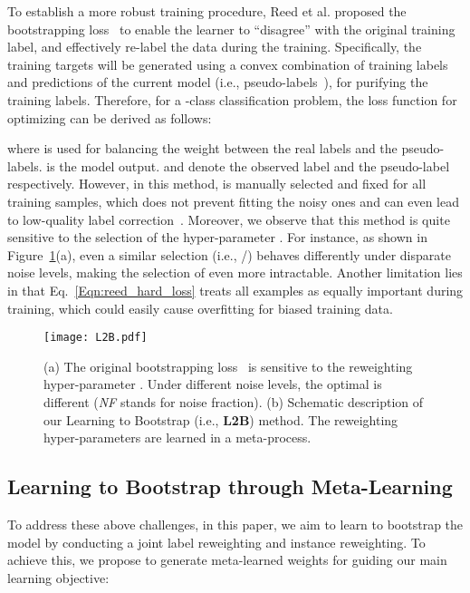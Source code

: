 \documentclass{article}
\begin{document}
To establish a more robust training procedure, Reed et al. proposed the bootstrapping loss~\cite{reed2014training} to enable the learner to ``disagree'' with the original training label, and effectively re-label the data during the training. Specifically, the training targets will be generated using a convex combination of training labels and predictions of the current model (i.e., pseudo-labels~\cite{lee2013pseudo}), for purifying the training labels. Therefore, for a -class classification problem, the loss function for optimizing  can be derived as follows:


where  is used for balancing the weight between the real labels and the pseudo-labels.  is the model output.  and  denote the observed label and the pseudo-label respectively.
However, in this method,  is manually selected and fixed for all training samples, which does not prevent fitting the noisy ones and can even lead to low-quality label correction~\cite{arazo2019unsupervised}.
Moreover, we observe that this method is quite sensitive to the selection of the hyper-parameter .
For instance, as shown in Figure~\ref{fig:overview}(a), even a similar  selection (i.e., /) behaves differently under disparate noise levels, making the selection of  even more intractable.
Another limitation lies in that Eq.~\eqref{Eqn:reed_hard_loss} treats all examples as equally important during training, which could easily cause overfitting for biased training data.


\begin{figure}[t]
\begin{center}
\texttt{[image: L2B.pdf]}
\end{center}
\vspace{-2em}
  \caption{(a) The original bootstrapping loss~\cite{reed2014training} is sensitive to the reweighting hyper-parameter . Under different noise levels, the optimal  is different (\emph{NF} stands for noise fraction). (b) Schematic description of our Learning to Bootstrap (i.e., \textbf{L2B}) method. The reweighting hyper-parameters are learned in a meta-process.}
\vspace{-1em}
\label{fig:overview}
\end{figure}

\subsection{Learning to Bootstrap through Meta-Learning}
To address these above challenges, in this paper, we aim to learn to bootstrap the model by conducting a joint label reweighting and instance reweighting.
To achieve this, we propose to generate meta-learned weights for guiding our main learning objective: 
\end{document}
